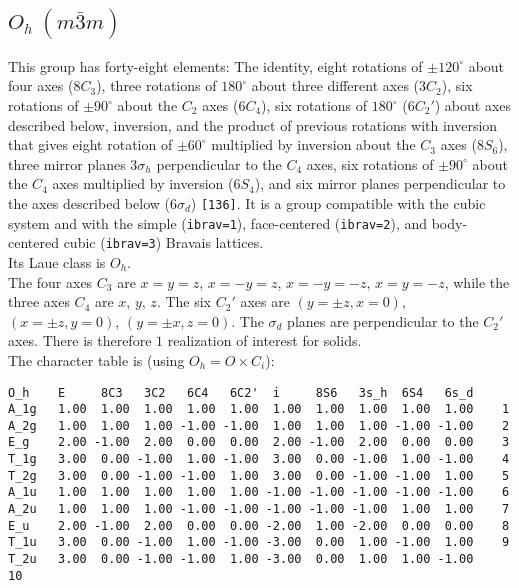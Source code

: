 \documentclass[12pt,a4paper]{article}
\begin{document}
\newpage
\subsection{\color{web-blue}$O_h\ (m\bar3m)$}   
This group has forty-eight elements: 
The identity, eight rotations of $\pm120^\circ$ about four axes ($8C_3$), 
three rotations of $180^\circ$ about three different axes ($3C_2$), six
rotations of $\pm90^\circ$ about the $C_2$ axes ($6C_4$), 
six rotations of $180^\circ$ ($6C_2'$) about axes described below, 
inversion, and the product of previous rotations with inversion that gives
eight rotation of $\pm60^\circ$ multiplied by inversion about the $C_3$ axes 
($8S_6$), three mirror planes $3\sigma_h$ perpendicular to the $C_4$ axes,
six rotations of $\pm90^\circ$ about the $C_4$ axes multiplied by inversion
($6S_4$), and six mirror planes perpendicular to the axes described
below ($6\sigma_d$) \texttt{[136]}. It is a group compatible with the 
cubic system and with the  
simple (\texttt{ibrav=1}), face-centered (\texttt{ibrav=2}), 
and body-centered cubic (\texttt{ibrav=3}) Bravais lattices. \\
Its Laue class is $O_{h}$. \\
The four axes $C_3$ are $x=y=z$, $x=-y=z$, $x=-y=-z$, $x=y=-z$, while
the three axes $C_4$ are $x$, $y$, $z$. 
The six $C_2'$ axes are $(y=\pm z, x=0)$, $(x=\pm z, y=0)$, $(y=\pm x, z=0)$.
The $\sigma_d$ planes are perpendicular to the $C_2'$ axes.
There is therefore $1$ realization of interest for solids. \\
The character table is (using $O_h=O \times C_i$):
\begin{footnotesize}
\begin{verbatim}
O_h    E     8C3   3C2   6C4   6C2'  i     8S6   3s_h  6S4   6s_d 
A_1g   1.00  1.00  1.00  1.00  1.00  1.00  1.00  1.00  1.00  1.00    1
A_2g   1.00  1.00  1.00 -1.00 -1.00  1.00  1.00  1.00 -1.00 -1.00    2
E_g    2.00 -1.00  2.00  0.00  0.00  2.00 -1.00  2.00  0.00  0.00    3
T_1g   3.00  0.00 -1.00  1.00 -1.00  3.00  0.00 -1.00  1.00 -1.00    4
T_2g   3.00  0.00 -1.00 -1.00  1.00  3.00  0.00 -1.00 -1.00  1.00    5
A_1u   1.00  1.00  1.00  1.00  1.00 -1.00 -1.00 -1.00 -1.00 -1.00    6
A_2u   1.00  1.00  1.00 -1.00 -1.00 -1.00 -1.00 -1.00  1.00  1.00    7
E_u    2.00 -1.00  2.00  0.00  0.00 -2.00  1.00 -2.00  0.00  0.00    8
T_1u   3.00  0.00 -1.00  1.00 -1.00 -3.00  0.00  1.00 -1.00  1.00    9
T_2u   3.00  0.00 -1.00 -1.00  1.00 -3.00  0.00  1.00  1.00 -1.00    10
\end{verbatim}
\end{footnotesize}
\end{document}

